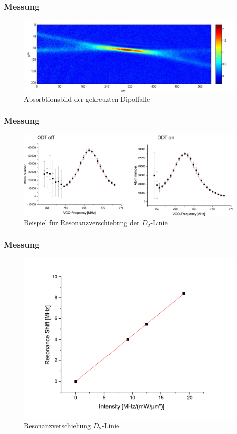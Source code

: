 \documentclass{beamer}
\begin{document}
\begin{frame}
	\frametitle{Messung}
\centering
	\begin{figure}
                \includegraphics[scale=0.4]{dipolefoto}
           	\caption{Absorbtionsbild der gekreuzten Dipolfalle}
\end{figure}
\end{frame}
\begin{frame}
	\frametitle{Messung}
\centering
	\begin{figure}
                \includegraphics[scale=0.22]{withwithout}
           	\caption{Beispiel für Resonanzverschiebung der $D_2$-Linie}
\end{figure}
\end{frame}
\begin{frame}
	\frametitle{Messung}
\centering
	\begin{figure}
                \includegraphics[scale=0.3]{shiftintens-eps-converted-to}
           	\caption{Resonanzverschiebung $D_2$-Linie}
\end{figure}
\end{frame}
\end{document}
